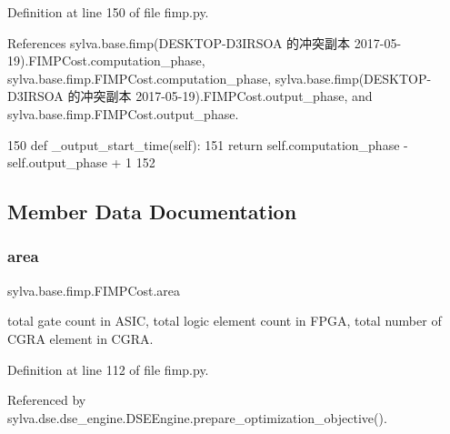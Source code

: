 Definition at line 150 of file fimp.\+py.



References sylva.\+base.\+fimp(\+D\+E\+S\+K\+T\+O\+P-\/\+D3\+I\+R\+S\+O\+A 的冲突副本 2017-\/05-\/19).\+F\+I\+M\+P\+Cost.\+computation\+\_\+phase, sylva.\+base.\+fimp.\+F\+I\+M\+P\+Cost.\+computation\+\_\+phase, sylva.\+base.\+fimp(\+D\+E\+S\+K\+T\+O\+P-\/\+D3\+I\+R\+S\+O\+A 的冲突副本 2017-\/05-\/19).\+F\+I\+M\+P\+Cost.\+output\+\_\+phase, and sylva.\+base.\+fimp.\+F\+I\+M\+P\+Cost.\+output\+\_\+phase.


\begin{DoxyCode}
150     \textcolor{keyword}{def }\_output\_start\_time(self):
151         \textcolor{keywordflow}{return} self.computation\_phase - self.output\_phase + 1
152 
\end{DoxyCode}


\subsection{Member Data Documentation}
\mbox{\label{classsylva_1_1base_1_1fimp_1_1_f_i_m_p_cost_afba92218e139335948c9dcba3c9aabd4}} 
\subsubsection{\texorpdfstring{area}{area}}
{\footnotesize\ttfamily sylva.\+base.\+fimp.\+F\+I\+M\+P\+Cost.\+area}



total gate count in A\+S\+IC, total logic element count in F\+P\+GA, total number of C\+G\+RA element in C\+G\+RA. 



Definition at line 112 of file fimp.\+py.



Referenced by sylva.\+dse.\+dse\+\_\+engine.\+D\+S\+E\+Engine.\+prepare\+\_\+optimization\+\_\+objective().

\mbox{\label{classsylva_1_1base_1_1fimp_1_1_f_i_m_p_cost_a8e52dbdc89608f7d5b4da0e7538eaa0e}} 
